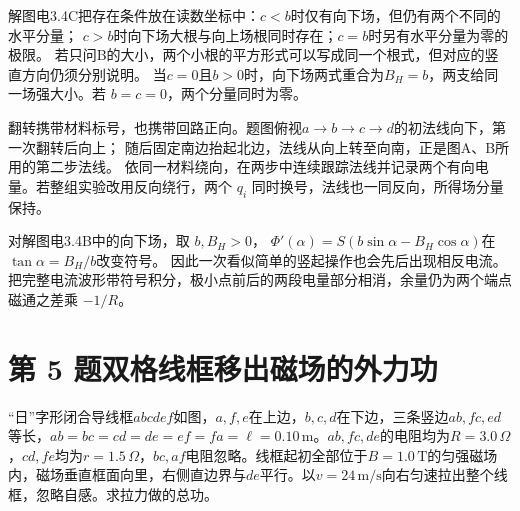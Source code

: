 \documentclass[UTF8,fontset=fandol,a4paper,11pt]{ctexart}
\newcommand{\figcaption}[1]{\par\vspace{2pt}{\small\color{muted}#1}\par}
\begin{document}
解图电3.4C把存在条件放在读数坐标中：$c<b$时仅有向下场，但仍有两个不同的水平分量；
$c>b$时向下场大根与向上场根同时存在；$c=b$时另有水平分量为零的极限。
若只问B的大小，两个小根的平方形式可以写成同一个根式，但对应的竖直方向仍须分别说明。
当$c=0$且$b>0$时，向下场两式重合为$B_H=b$，两支给同一场强大小。若 $b=c=0$，两个分量同时为零。

翻转携带材料标号，也携带回路正向。题图俯视$a\to b\to c\to d$的初法线向下，第一次翻转后向上；
随后固定南边抬起北边，法线从向上转至向南，正是图A、B所用的第二步法线。
依同一材料绕向，在两步中连续跟踪法线并记录两个有向电量。若整组实验改用反向绕行，两个 $q_i$ 同时换号，法线也一同反向，所得场分量保持。

对解图电3.4B中的向下场，取 $b,B_H>0$，
$\Phi'(\alpha)=S(b\sin\alpha-B_H\cos\alpha)$在$\tan\alpha=B_H/b$改变符号。
因此一次看似简单的竖起操作也会先后出现相反电流。把完整电流波形带符号积分，极小点前后的两段电量部分相消，余量仍为两个端点磁通之差乘 $-1/R$。




\section*{第 5 题\quad 双格线框移出磁场的外力功}\label{q:5}

“日”字形闭合导线框$abcdef$如图，$a,f,e$在上边，$b,c,d$在下边，三条竖边$ab,fc,ed$等长，$ab=bc=cd=de=ef=fa=\ell=0.10\,\mathrm m$。$ab,fc,de$的电阻均为$R=3.0\,\Omega$，$cd,fe$均为$r=1.5\,\Omega$，$bc,af$电阻忽略。线框起初全部位于$B=1.0\,\mathrm T$的匀强磁场内，磁场垂直框面向里，右侧直边界与$de$平行。以$v=24\,\mathrm{m/s}$向右匀速拉出整个线框，忽略自感。求拉力做的总功。

\begin{center}\begin{minipage}{.98\linewidth}\centering
{}\figcaption{图电3.5\quad 两格均为边长$\ell$的正方形；图示右边已离开场区。}\end{minipage}\end{center}
\end{document}
